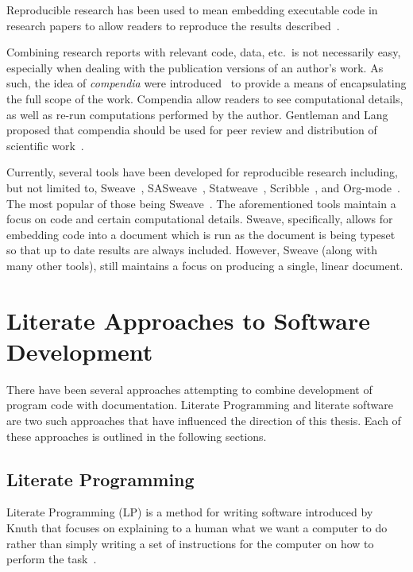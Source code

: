 Reproducible research has been used to mean embedding executable code in
research papers to allow readers to reproduce the results
described~\cite{SchulteEtAl2012}.

Combining research reports with relevant code, data, etc.\ is not necessarily
easy, especially when dealing with the publication versions of an author's work.
As such, the idea of \emph{compendia} were
introduced~\cite{GentlemanAndLang2012} to provide a means of encapsulating the
full scope of the work. Compendia allow readers to see computational details, as
well as re-run computations performed by the author. Gentleman and Lang proposed
that compendia should be used for peer review and distribution of scientific
work~\cite{GentlemanAndLang2012}.

Currently, several tools have been developed for reproducible research
including, but not limited to, Sweave~\cite{Leisch2002},
SASweave~\cite{LenthEtAl2007}, Statweave~\cite{Lenth2009},
Scribble~\cite{FlattEtAl2009}, and Org-mode~\cite{SchulteEtAl2012}. The most
popular of those being Sweave~\cite{SchulteEtAl2012}. The aforementioned tools
maintain a focus on code and certain computational details. Sweave,
specifically, allows for embedding code into a document which is run as the
document is being typeset so that up to date results are always included.
However, Sweave (along with many other tools), still maintains a focus on
producing a single, linear document. 

\section{Literate Approaches to Software Development}

There have been several approaches attempting to combine development of program 
code with documentation. Literate Programming and literate software are two 
such approaches that have influenced the direction of this thesis. Each of 
these approaches is outlined in the following sections.

\subsection{Literate Programming}

Literate Programming (LP) is a method for writing software introduced by Knuth 
that focuses on explaining to a human what we want a computer to do rather than 
simply writing a set of instructions for the computer on how to perform the 
task~\cite{Knuth1984}.

